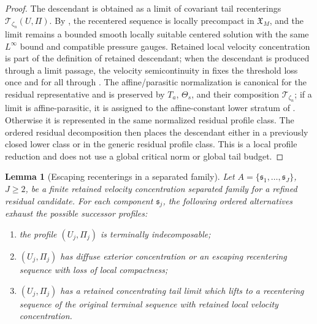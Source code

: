 \documentclass[11pt]{amsart}
\numberwithin{equation}{section}
\theoremstyle{plain}
\newtheorem{lemma}[lemma]{Lemma}
\theoremstyle{definition}
\theoremstyle{remark}
\begin{document}
\begin{proof}
The descendant is obtained as a limit of covariant tail recenterings
\(\mathscr T_{\zeta_n}(U,\Pi)\).  By
, the recentered sequence is locally
precompact in \(\mathfrak X_M\), and the limit remains a bounded smooth
locally suitable centered solution with the same \(L^\infty\) bound and
compatible pressure gauges.  Retained local velocity concentration is part of the
definition of retained descendant; when the descendant is produced through a
limit passage, the velocity semicontinuity in 
fixes the threshold loss once and
for all through .  The affine/parasitic
normalization is canonical for the residual representative and is preserved by
\(T_a\), \(\Theta_s\), and their composition
\(\mathscr T_{\zeta_n}\); if a limit is affine-parasitic, it is assigned to the
affine-constant lower stratum of
.  Otherwise it is represented in the
same normalized residual profile class.  The ordered residual decomposition then
places the descendant either in a previously closed lower class or in the
generic residual profile class.  This is a local profile reduction and does
not use a global critical norm or global tail budget.
\end{proof}

\begin{lemma}[Escaping recenterings in a separated family]
\label{lem:finite-successor-alternatives}
Let \(A=\{\mathfrak s_1,\dots,\mathfrak s_J\}\), \(J\ge2\), be a finite
retained velocity concentration separated family for a refined residual candidate.  For each component
\(\mathfrak s_j\), the following ordered alternatives exhaust the possible
successor profiles:
\begin{enumerate}[label=(\roman*)]
   \item the profile \((U_j,\Pi_j)\) is terminally indecomposable;
   \item \((U_j,\Pi_j)\) has diffuse exterior concentration or an escaping
   recentering sequence with loss of local compactness;
   \item \((U_j,\Pi_j)\) has a retained concentrating tail limit which lifts to a
   recentering sequence of the original terminal sequence with retained local
   velocity concentration.
\end{enumerate}
\end{lemma}
\end{document}
